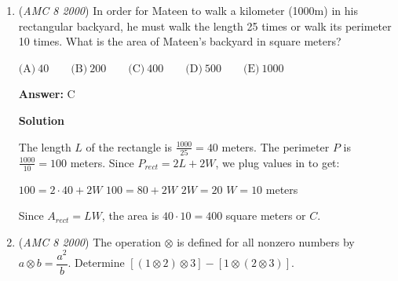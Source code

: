 \begin{enumerate}
\textbf{Solution 2}

The perimeter of $ABCDEFG$ is the perimeter of the three triangles, minus segments $AD$ and $EG$, which are on the interior of the figure.  Because each of these segments is on two triangles, each segment must be subtracted two times.

 As in solution 1, the sides of the triangles are $4, 2,$ and $1$, and the perimeters of the triangles are thus $12, 6,$ and $3$.

 The perimeter of the three triangles is $12 + 6 + 3 = 21$.  Subtracting the two segments $AD$ and $EG$ two times, the perimeter of $ABCDEFG$ is $21 - 2 - 1 - 2 - 1 = 15$, and the answer is $\boxed{C}$.

 



\textbf{Solution 3}

First, remove segments $DA$, and $EG$. Notice that segments $DE$, and $AG$ can fit into $DA$, and $EG$, respectively. This means we only need to account for the perimeters of triangles $ABC$, and $EFG$, whose perimeters are $12$, and $3$ respectively. Adding these perimeters gives us $12+3=15$, or answer choice $\boxed{C}$.~Electric\_Cheetah\_88

 


	\item (\textit{AMC 8 2000}) In order for Mateen to walk a kilometer (1000m) in his rectangular backyard, he must walk the length 25 times or walk its perimeter 10 times. What is the area of Mateen's backyard in square meters?


 $\text{(A)}\ 40 \qquad \text{(B)}\ 200 \qquad \text{(C)}\ 400 \qquad \text{(D)}\ 500 \qquad \text{(E)}\ 1000$

 \textbf{Answer: }C



\textbf{Solution}

The length $L$ of the rectangle is $\frac{1000}{25}=40$ meters. The perimeter $P$ is $\frac{1000}{10}=100$ meters. Since $P_{rect} = 2L + 2W$, we plug values in to get:

 $100 = 2\cdot 40 + 2W$
$100 = 80 + 2W$
$2W = 20$
$W = 10$ meters

 Since $A_{rect} = LW$, the area is $40\cdot 10=400$ square meters or $\boxed{C}$.

 


	\item (\textit{AMC 8 2000}) The operation $\otimes$ is defined for all nonzero numbers by $a\otimes b = \dfrac{a^2}{b}$. Determine $[(1\otimes 2)\otimes 3] - [1\otimes (2\otimes 3)]$.



\end{enumerate}
